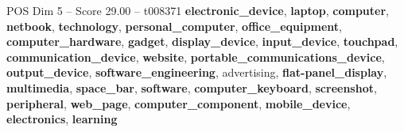 \begin{textsample}{POS Dim 5 – Score 29.00 – t008371}  \label{ex:f5_pos_024}
\textbf{electronic\_device}, \textbf{laptop}, \textbf{computer}, \textbf{netbook}, \textbf{technology}, \textbf{personal\_computer}, \textbf{office\_equipment}, \textbf{computer\_hardware}, \textbf{gadget}, \textbf{display\_device}, \textbf{input\_device}, \textbf{touchpad}, \textbf{communication\_device}, \textbf{website}, \textbf{portable\_communications\_device}, \textbf{output\_device}, \textbf{software\_engineering}, advertising, \textbf{flat-panel\_display}, \textbf{multimedia}, \textbf{space\_bar}, \textbf{software}, \textbf{computer\_keyboard}, \textbf{screenshot}, \textbf{peripheral}, \textbf{web\_page}, \textbf{computer\_component}, \textbf{mobile\_device}, \textbf{electronics}, \textbf{learning}

\end{textsample}
